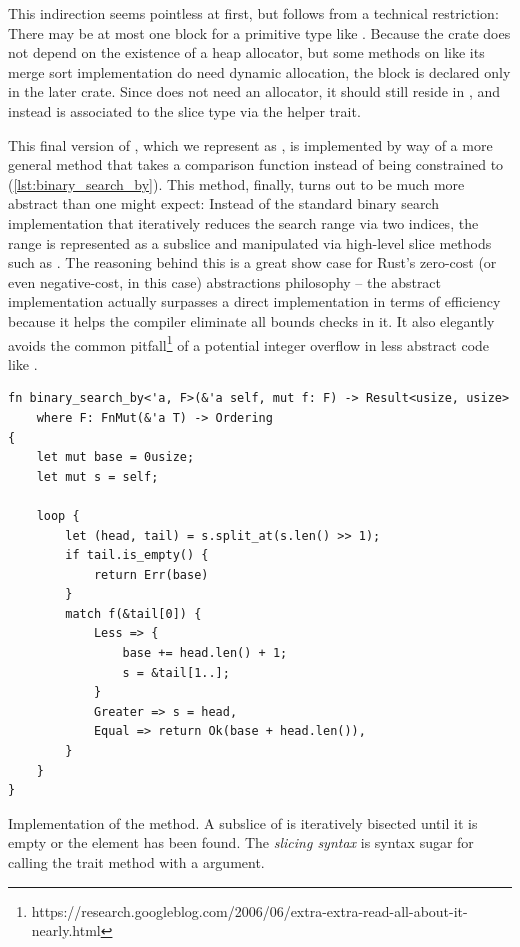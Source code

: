 This indirection seems pointless at first, but follows from a technical
restriction: There may be at most one  block for a primitive type
like \rust{[T]}. Because the  crate does not depend on the existence
of a heap allocator, but some methods on \rust{[T]} like its merge sort
implementation do need dynamic allocation, the  block is
declared only in the later  crate. Since  does
not need an allocator, it should still reside in , and instead is
associated to the slice type via the helper trait.

This final version of , which we represent as
, is implemented by way of a more
general method  that takes a comparison function instead
of being constrained to  (\autoref{lst:binary_search_by}). This
method, finally, turns out to be much more abstract than one might expect: Instead of
the standard binary search implementation that iteratively reduces the search range via two
indices, the range is represented as a subslice and manipulated via high-level
slice methods such as . The reasoning behind this is a great show
case for Rust's zero-cost (or even negative-cost, in this case) abstractions
philosophy -- the abstract implementation actually surpasses a direct
implementation in terms of efficiency because it helps the compiler eliminate
all bounds checks in it. It also elegantly avoids the common
pitfall\footnote{https://research.googleblog.com/2006/06/extra-extra-read-all-about-it-nearly.html}
of a potential integer overflow in less abstract code like .

\begin{listing}[bp]
\begin{verbatim}
fn binary_search_by<'a, F>(&'a self, mut f: F) -> Result<usize, usize>
    where F: FnMut(&'a T) -> Ordering
{
    let mut base = 0usize;
    let mut s = self;

    loop {
        let (head, tail) = s.split_at(s.len() >> 1);
        if tail.is_empty() {
            return Err(base)
        }
        match f(&tail[0]) {
            Less => {
                base += head.len() + 1;
                s = &tail[1..];
            }
            Greater => s = head,
            Equal => return Ok(base + head.len()),
        }
    }
}
\end{verbatim}
  
\caption{Implementation of the  method. A subslice
   of  is iteratively bisected until it is empty or the
  element has been found. The  \emph{slicing syntax} is
  syntax sugar for calling the  trait method with a
   argument.}
\label{lst:binary_search_by}
\end{listing}


